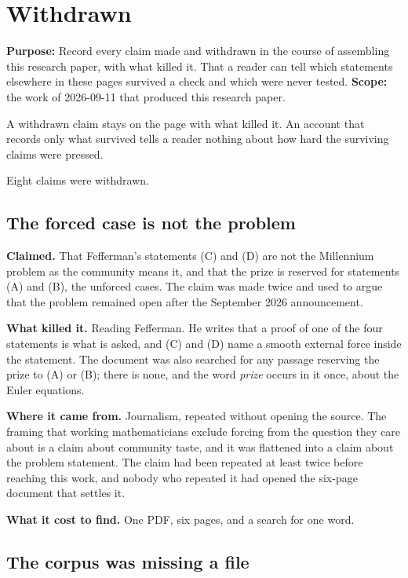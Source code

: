 \chapter{Withdrawn}

\textbf{Purpose:} Record every claim made and withdrawn in the course of assembling this research paper,
with what killed it. That a reader can tell which statements elsewhere in these pages survived a
check and which were never tested. \textbf{Scope:} the work of 2026-09-11 that produced this
research paper.

A withdrawn claim stays on the page with what killed it. An account that records only what survived
tells a reader nothing about how hard the surviving claims were pressed.

Eight claims were withdrawn.

\section{The forced case is not the problem}

\textbf{Claimed.} That Fefferman's statements (C) and (D) are not the Millennium problem as the
community means it, and that the prize is reserved for statements (A) and (B), the unforced cases.
The claim was made twice and used to argue that the problem remained
open after the September 2026 announcement.

\textbf{What killed it.} Reading Fefferman. He writes that a proof of one of the four statements is
what is asked, and (C) and (D) name a smooth external force inside the statement. The document was
also searched for any passage reserving the prize to (A) or (B); there is none, and the word
\emph{prize} occurs in it once, about the Euler equations.

\textbf{Where it came from.} Journalism, repeated without opening the source. The framing that
working mathematicians exclude forcing from the question they care about is a claim about community
taste, and it was flattened into a claim about the problem statement. The claim had been
repeated at least twice before reaching this work, and nobody who repeated it had opened the
six-page document that settles it.

\textbf{What it cost to find.} One PDF, six pages, and a search for one word.

\section{The corpus was missing a file}

